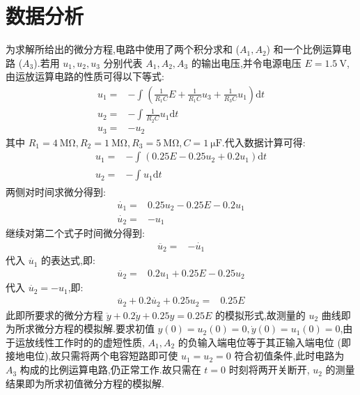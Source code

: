     \section{数据分析}
    为求解所给出的微分方程,电路中使用了两个积分求和 ($A_1,A_2$) 和一个比例运算电路 ($A_3$).若用 $u_1,u_2,u_3$ 分别代表 $A_1,A_2,A_3$ 的输出电压,并令电源电压 $E=1.5 \ \mathrm{V}$,由运放运算电路的性质可得以下等式:
    \begin{align}
        u_1=&-\int_{}^{}\left( \frac{1}{R_1C}E+\frac{1}{R_1C}u_3+\frac{1}{R_3C}u_1 \right)\mathrm{d}t\nonumber\\
        u_2=&-\int_{}^{}\frac{1}{R_2C}u_1 \mathrm{d}t\nonumber\\
        u_3=&-u_2\nonumber
    \end{align}
    其中 $R_1=4 \ \mathrm{M\Omega},R_2=1 \ \mathrm{M \Omega},R_3=5 \ \mathrm{M\Omega},C=1 \ \mathrm{\mu F}$.代入数据计算可得:
    \begin{align}
        u_1=&-\int_{}^{}\left( 0.25E-0.25u_2+0.2u_1 \right) \mathrm{d}t\nonumber\\
        u_2=&-\int_{}^{}u_1\mathrm{d}t\nonumber
    \end{align}
    两侧对时间求微分得到:
    \begin{align}
        \dot{u_1}=&0.25u_2-0.25E-0.2u_1\nonumber\\
        \dot{u_2}=&-u_1\nonumber
    \end{align}
    继续对第二个式子时间微分得到:
    \begin{align}
        \ddot{u_2}=&-\dot{u_1}\nonumber
    \end{align}
    代入 $\dot{u_1}$ 的表达式,即:
    \begin{align}
        \ddot{u_2}=&0.2u_1+0.25E-0.25u_2\nonumber
    \end{align}
    代入 $\dot{u_2}=-u_1$,即:
    \begin{align}
        \ddot{u_2}+0.2 \dot{u_2}+0.25u_2=&0.25E\nonumber
    \end{align}
    此即所要求的微分方程 $\ddot{y}+0.2 \dot{y}+0.25y=0.25E$ 的模拟形式,故测量的 $u_2$ 曲线即为所求微分方程的模拟解.要求初值 $y\left( 0 \right) =u_2\left( 0 \right) =0,\dot{y}\left( 0 \right) =u_1\left( 0 \right) =0$,由于运放线性工作时的的虚短性质, $A_1,A_2$ 的负输入端电位等于其正输入端电位 (即接地电位),故只需将两个电容短路即可使 $u_1=u_2=0$ 符合初值条件,此时电路为 $A_3$ 构成的比例运算电路,仍正常工作.故只需在 $t=0$ 时刻将两开关断开, $u_2$ 的测量结果即为所求初值微分方程的模拟解.

